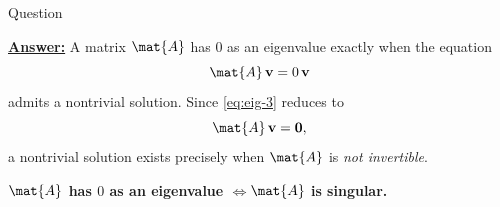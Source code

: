 \begin{frame}[fragile,t]{Question}
    \textbf{}

    \begin{alertblock}{\textbf{\underline{Answer:}}}\medskip
        A matrix $\mat{A}$ has $0$ as an eigenvalue exactly when the equation
        \begin{equation} \label{eq:eig-3}
            \mat{A}\,\mathbf{v} = 0\,\mathbf{v}
        \end{equation}
        admits a nontrivial solution.
        Since \eqref{eq:eig-3} reduces to
        \[
            \mat{A}\,\mathbf{v} = \mathbf{0},
        \]
        a nontrivial solution exists precisely when $\mat{A}$ is \emph{not invertible}.\\[1mm]

        \begin{center}
            \textbf{$\mat{A}$ has $0$ as an eigenvalue \quad$\Longleftrightarrow$\quad $\mat{A}$ is singular.}
        \end{center}
    \end{alertblock}

\end{frame}


